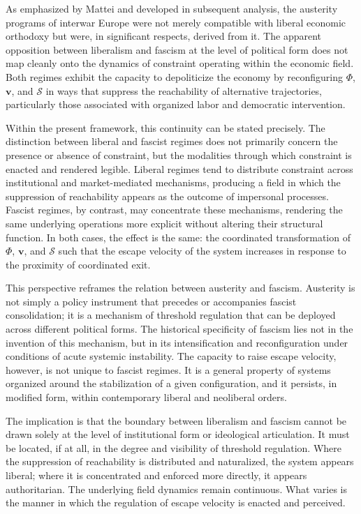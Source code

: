 \documentclass[11pt, a4paper]{article}
\begin{document}
As emphasized by Mattei \cite{mattei2022} and developed in subsequent analysis, the austerity programs of interwar Europe were not merely compatible with liberal economic orthodoxy but were, in significant respects, derived from it. The apparent opposition between liberalism and fascism at the level of political form does not map cleanly onto the dynamics of constraint operating within the economic field. Both regimes exhibit the capacity to depoliticize the economy by reconfiguring $\Phi$, $\mathbf{v}$, and $\mathcal{S}$ in ways that suppress the reachability of alternative trajectories, particularly those associated with organized labor and democratic intervention.

Within the present framework, this continuity can be stated precisely. The distinction between liberal and fascist regimes does not primarily concern the presence or absence of constraint, but the modalities through which constraint is enacted and rendered legible. Liberal regimes tend to distribute constraint across institutional and market-mediated mechanisms, producing a field in which the suppression of reachability appears as the outcome of impersonal processes. Fascist regimes, by contrast, may concentrate these mechanisms, rendering the same underlying operations more explicit without altering their structural function. In both cases, the effect is the same: the coordinated transformation of $\Phi$, $\mathbf{v}$, and $\mathcal{S}$ such that the escape velocity of the system increases in response to the proximity of coordinated exit.

This perspective reframes the relation between austerity and fascism. Austerity is not simply a policy instrument that precedes or accompanies fascist consolidation; it is a mechanism of threshold regulation that can be deployed across different political forms. The historical specificity of fascism lies not in the invention of this mechanism, but in its intensification and reconfiguration under conditions of acute systemic instability. The capacity to raise escape velocity, however, is not unique to fascist regimes. It is a general property of systems organized around the stabilization of a given configuration, and it persists, in modified form, within contemporary liberal and neoliberal orders.

The implication is that the boundary between liberalism and fascism cannot be drawn solely at the level of institutional form or ideological articulation. It must be located, if at all, in the degree and visibility of threshold regulation. Where the suppression of reachability is distributed and naturalized, the system appears liberal; where it is concentrated and enforced more directly, it appears authoritarian. The underlying field dynamics remain continuous. What varies is the manner in which the regulation of escape velocity is enacted and perceived.
\end{document}
